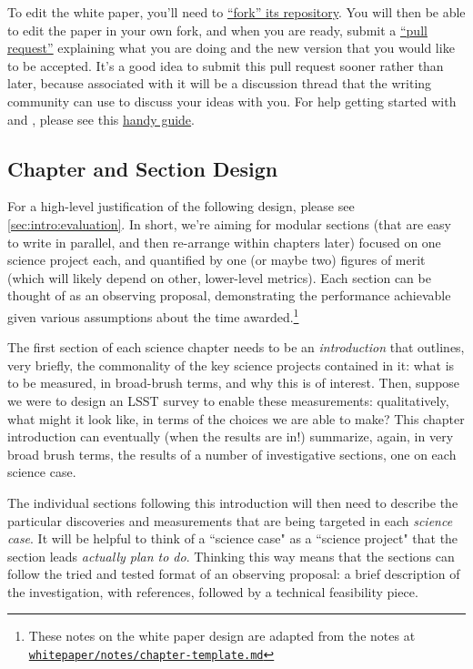 To edit the white paper, you'll need to
\href{https://help.github.com/articles/fork-a-repo/}{``fork'' its
repository}. You will then  be able to edit the paper in your own
fork, and when you are ready,  submit a
\href{https://help.github.com/articles/using-pull-requests/}{``pull
request''} explaining what you are doing and the new version that  you
would like to be accepted. It's a good idea to submit this pull
request sooner rather than later, because associated with it will be a
discussion thread that the writing community can use to discuss your
ideas with you. For help getting started with \git and \GitHub, please
see this
\href{https://github.com/drphilmarshall/GettingStarted#top}{handy
guide}.


\subsection{Chapter and Section Design}

For a high-level justification of the following design, please see
\autoref{sec:intro:evaluation}. In short, we're aiming for modular
sections (that are easy to write in parallel, and then re-arrange
within chapters later) focused on one science project each, and
quantified by one (or maybe two) figures of merit (which will likely
depend on other, lower-level metrics). Each section can be thought of
as an observing proposal, demonstrating the performance achievable
given various assumptions about the time awarded.\footnote{These notes
on the white paper design are adapted from the notes at
\href{https://github.com/LSSTScienceCollaborations/ObservingStrategy/blob/master/whitepaper/notes/chapter-template.md}{\texttt{whitepaper/notes/chapter-template.md}}}


The first section of each science chapter needs to be an \textit{introduction}
that outlines, very briefly, the commonality of the key science projects
contained in it:  what is to be measured, in broad-brush terms, and
why this is of interest. Then, suppose we were to design an LSST
survey to enable these measurements: qualitatively, what might it look
like, in terms of the choices we are able to make? This chapter
introduction can eventually (when the results are in!) summarize,
again, in very broad brush terms, the results of a number of
investigative sections, one on each science case.

The individual sections following this introduction will then need to
describe the particular discoveries and measurements that are being
targeted in each \textit{science case}. It will be helpful to think of a
``science case" as a ``science project" that the section leads {\it
actually plan to do}. Thinking this way means that the sections can
follow the tried and tested format of an observing proposal: a brief
description of the investigation, with references, followed by a
technical feasibility piece.


